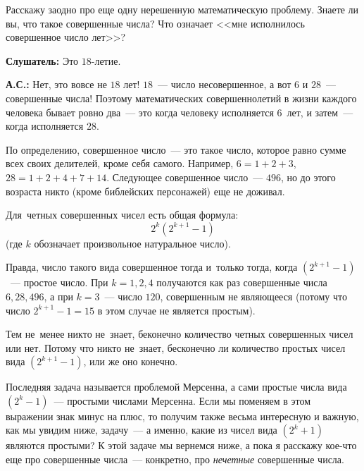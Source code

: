 %
%
Расскажу заодно про еще одну нерешенную математическую проблему. Знаете ли вы,
что такое совершенные числа? Что означает <<мне исполнилось совершенное число лет>>?

\textbf{Слушатель:} Это $18$-летие.

\textbf{А.С.:} Нет, это вовсе не $18$ лет! $18$~--- число несовершенное, а вот $6$ и $28$~--- совершенные
числа! Поэтому математических совершеннолетий в жизни каждого человека бывает ровно два~--- это когда
человеку исполняется $6$~лет, и затем~--- когда исполняется $28$.

По определению, совершенное число~--- это такое число, которое равно сумме всех своих делителей,
кроме себя самого. Например, $6=1+2+3$, $28=1+2+4+7+14$. Следующее совершенное число~---
$496$, но до этого возраста никто (кроме библейских персонажей) еще не доживал.


Для~четных совершенных чисел есть общая формула:
$$
2^{k}(2^{k+1}-1)
$$
(где $k$ обозначает произвольное натуральное число).

Правда, число такого вида совершенное тогда и~только тогда, когда $(2^{k+1}-1)$~--- простое
число. При $k=1, 2, 4$ получаются как раз совершенные числа $6, 28, 496$, а при $k=3$~--- число
$120$, совершенным не являющееся (потому что число $2^{k+1}-1=15$ в этом случае не является простым).


Тем не~менее никто не~знает, беконечно количество четных совершенных чисел или нет.
Потому что никто не~знает, бесконечно ли количество простых чисел вида $(2^{k+1}-1)$, или же оно конечно.

Последняя задача называется проблемой Мерсенна, а сами простые числа вида $(2^k-1)$~--- простыми
числами Мерсенна. Если мы поменяем в этом выражении знак минус на плюс, то получим также весьма интересную
и важную, как мы увидим ниже, задачу~--- а именно, какие из чисел вида $(2^k+1)$ являются
простыми?
 К этой задаче мы вернемся ниже, а пока я расскажу кое-что еще про совершенные
числа~--- конкретно, про {\em нечетные} совершенные числа.

